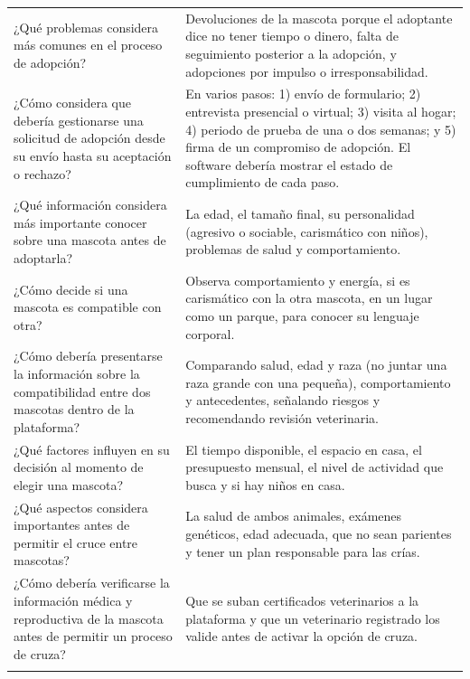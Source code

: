 \documentclass[journal,onecolumn]{IEEEtran}
\begin{document}
{\begin{longtable}{@{}p{5.6cm} p{9.4cm}@{}}
			¿Qué problemas considera más comunes en el proceso de adopción? & Devoluciones de la mascota porque el adoptante dice no tener tiempo o dinero, falta de seguimiento posterior a la adopción, y adopciones por impulso o irresponsabilidad. \\ \addlinespace
			
			¿Cómo considera que debería gestionarse una solicitud de adopción desde su envío hasta su aceptación o rechazo? & En varios pasos: 1) envío de formulario; 2) entrevista presencial o virtual; 3) visita al hogar; 4) periodo de prueba de una o dos semanas; y 5) firma de un compromiso de adopción. El software debería mostrar el estado de cumplimiento de cada paso. \\ \addlinespace
			
			¿Qué información considera más importante conocer sobre una mascota antes de adoptarla? & La edad, el tamaño final, su personalidad (agresivo o sociable, carismático con niños), problemas de salud y comportamiento. \\ \addlinespace
			
			¿Cómo decide si una mascota es compatible con otra? & Observa comportamiento y energía, si es carismático con la otra mascota, en un lugar como un parque, para conocer su lenguaje corporal. \\ \addlinespace
			
			¿Cómo debería presentarse la información sobre la compatibilidad entre dos mascotas dentro de la plataforma? & Comparando salud, edad y raza (no juntar una raza grande con una pequeña), comportamiento y antecedentes, señalando riesgos y recomendando revisión veterinaria. \\ \addlinespace
			
			¿Qué factores influyen en su decisión al momento de elegir una mascota? & El tiempo disponible, el espacio en casa, el presupuesto mensual, el nivel de actividad que busca y si hay niños en casa. \\ \addlinespace
			
			¿Qué aspectos considera importantes antes de permitir el cruce entre mascotas? & La salud de ambos animales, exámenes genéticos, edad adecuada, que no sean parientes y tener un plan responsable para las crías. \\ \addlinespace
			
			¿Cómo debería verificarse la información médica y reproductiva de la mascota antes de permitir un proceso de cruza? & Que se suban certificados veterinarios a la plataforma y que un veterinario registrado los valide antes de activar la opción de cruza. \\ \addlinespace
			
		\end{longtable}
	}
	
\end{document}
